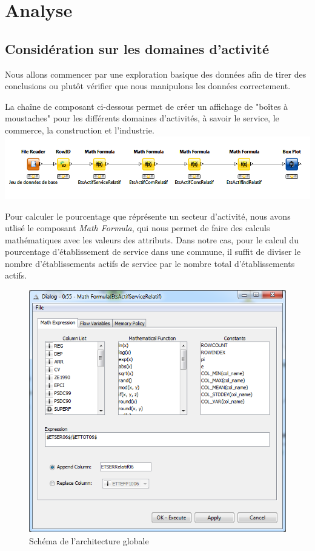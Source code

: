 \section{Analyse}

\subsection{Considération sur les domaines d'activité}

 Nous allons commencer par une exploration basique des données afin de tirer des conclusions ou plutôt vérifier que nous manipulons les données correctement.

La chaîne de composant ci-dessous permet de créer un affichage de "boîtes à moustaches" pour les différents domaines d'activités, à savoir le service, le commerce, la construction et l'industrie.
\includegraphics{png/BoxPlotDomainesActivité_knime.png}

Pour calculer le pourcentage que réprésente un secteur d'activité, nous avons utlisé le composant \textit{Math Formula}, qui nous permet de faire des calculs mathématiques avec les valeurs des attributs. Dans notre cas, pour le calcul du pourcentage d'établissement de service dans une commune, il suffit de diviser le nombre d'établissements actifs de service par le nombre total d'établissements actifs.

\begin{figure}[hb]
  \centering
  \includegraphics[width=15cm]{png/MathFormulaEtsActifServiceRelatif.png}
  \caption[Schéma de l'architecture globale]%
  {Schéma de l'architecture globale}
\end{figure}


